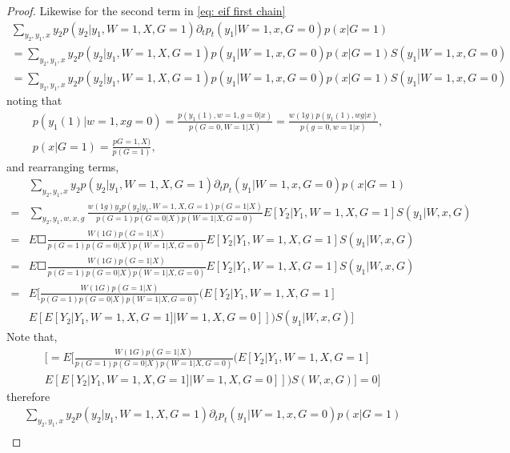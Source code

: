 \documentclass{article}
\begin{document}
\begin{proof}
Likewise for the second term in \ref{eq: eif first chain}
\begin{align*}
    \sum_ { y_2 ,y_1,x} y_2  p ( y_2| y_1 , W= 1, X , G= 1)\partial_t p_t ( y_1 | W =1 , x, G= 0 ) p( x | G =1 ) \\
=   \sum_ { y_2 ,y_1,x} y_2  p ( y_2| y_1 , W= 1, X , G= 1) p ( y_1 | W =1 , x, G= 0 ) p( x | G =1 ) S( y_1  | W =1, x, G = 0)  \\
=   \sum_ { y_2 ,y_1,x} y_2  p ( y_2| y_1 , W= 1, X , G= 1) p ( y_1 | W =1 , x, G= 0 ) p( x | G =1 ) S( y_1  | W =1, x, G = 0)
\end{align*} 
noting that
\begin{align*}
p ( y_1(1) | w = 1, x g = 0 ) = \frac{ p ( y _1(1) , w = 1, g  = 0 |x) } { p ( G =0, W =1 | X) } = \frac{ w ( 1 g) p( y_1(1) , w g | x) }{ p  (g =0, w =1 | x) } , \\
p ( x | G= 1) = \frac{ p  G =1, X ) } { p(G =1 ) },
\end{align*}
and rearranging terms,
\begin{align*}
&\sum_ { y_2 ,y_1,x} y_2  p ( y_2| y_1 , W= 1, X , G= 1)\partial_t p_t ( y_1 | W =1 , x, G= 0 ) p( x | G =1 ) \\ 
= &\sum_ { y_2 ,y_1,w,x, g} \frac{ w ( 1 g ) y_2   p ( y_2| y_1 , W= 1, X , G= 1) p(G =1 | X) }{ p(G=1) p ( G= 0 | X)  p ( W = 1 | X ,G =0) } E [ Y_2 |   Y_1 ,W = 1,X, G =1 ]   S( y_1  | W , x, G )  \\
= &E \Square{   \frac{ W ( 1 G)   p(G =1 | X) }{ p(G=1) p ( G= 0 | X)  p ( W = 1 | X ,G =0) } E [ Y_2 |   Y_1 ,W = 1, X, G =1 ]   S( y_1  | W , x, G )}\\
= &E \Square{  \frac{  W ( 1 G)   p(G =1 | X) }{ p(G=1) p ( G= 0 | X)  p ( W = 1 | X ,G =0) } E [ Y_2 |   Y_1 ,W = 1, X, G =1 ]   S( y_1  | W , x, G ) }\\
= &E [  \frac{  W ( 1 G)   p(G =1 | X) }{ p(G=1) p ( G= 0 | X)  p ( W = 1 | X ,G =0) } (E [ Y_2 |   Y_1 ,W = 1, X, G =1 ]  \\
&E [ E[ Y_2 | Y_1 , W =1 , X, G =1 ] | W=1, X, G= 0 ]] )  S( y_1  | W , x, G ) ]
\end{align*}
Note that,
\begin{align}
&[= E [  \frac{  W ( 1 G)   p(G =1 | X) }{ p(G=1) p ( G= 0 | X)  p ( W = 1 | X ,G =0) } (E [ Y_2 |   Y_1 ,W = 1, X, G =1 ]  \\
&E [ E[ Y_2 | Y_1 , W =1 , X, G =1 ] | W=1, X, G= 0 ]] )  S(  W , x, G ) ] = 0]
\end{align}
therefore
\begin{align*}
&\sum_ { y_2 ,y_1,x} y_2  p ( y_2| y_1 , W= 1, X , G= 1)\partial_t p_t ( y_1 | W =1 , x, G= 0 ) p( x | G =1 ) \\ 

\end{align*}
\end{proof}
\end{document}
